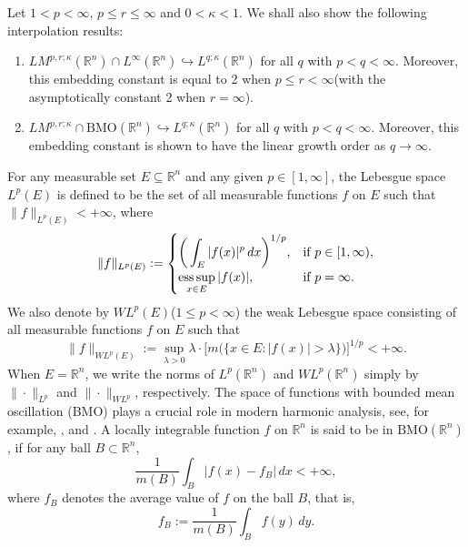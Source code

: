 \documentclass{birkjour}
\theoremstyle{definition}
\theoremstyle{remark}
\numberwithin{equation}{section}
\begin{document}
Let $1<p<\infty$, $p\leq r\leq\infty$ and $0<\kappa<1$. We shall also show the following interpolation results:
\begin{enumerate}
  \item $LM^{p,r;\kappa}(\mathbb R^n)\cap L^{\infty}(\mathbb R^n)\hookrightarrow L^{q;\kappa}(\mathbb R^n)$ for all $q$ with $p<q<\infty$. Moreover, this embedding constant is equal to 2 when $p\leq r<\infty$(with the asymptotically constant 2 when $r=\infty$).
  \item $LM^{p,r;\kappa}\cap \mathrm{BMO}(\mathbb R^n)\hookrightarrow L^{q;\kappa}(\mathbb R^n)$ for all $q$ with $p<q<\infty$. Moreover, this embedding constant is shown to have the linear growth order as $q\to\infty$.
\end{enumerate}
For any measurable set $E\subseteq\mathbb R^n$ and any given $p\in[1,\infty]$, the Lebesgue space $L^p(E)$ is defined to be the set of all measurable functions $f$ on $E$ such that $\|f\|_{L^p(E)}<+\infty$, where
\begin{equation*}
\|f\|_{L^p(E)}:=
\begin{cases}
\displaystyle\bigg(\int_{E}|f(x)|^p\,dx\bigg)^{1/p}, &\mbox{if}~ p\in[1,\infty),\\
\underset{x\in E}{\mbox{ess\,sup}}\,|f(x)|, &\mbox{if}~ p=\infty.
\end{cases}
\end{equation*}
We also denote by $WL^{p}(E)$($1\leq p<\infty$) the weak Lebesgue space consisting of all measurable functions $f$ on $E$ such that
\begin{equation*}
\|f\|_{WL^{p}(E)}:=
\sup_{\lambda>0}\lambda\cdot\Big[m\big(\big\{x\in E:|f(x)|>\lambda\big\}\big)\Big]^{1/p}<+\infty.
\end{equation*}
When $E=\mathbb R^n$, we write the norms of $L^p(\mathbb R^n)$ and $WL^{p}(\mathbb R^n)$ simply by $\|\cdot\|_{L^p}$ and $\|\cdot\|_{WL^{p}}$, respectively. The space of functions with bounded mean oscillation (BMO) plays a crucial role in modern harmonic analysis, see, for example,
\cite[Chapter 6]{duoand}, \cite[Chapter 3]{Grafakos} and \cite[Chapter 4]{stein2}. A locally integrable function $f$ on $\mathbb R^n$ is said to be in $\mathrm{BMO}(\mathbb R^n)$, if for any ball $B\subset\mathbb R^n$,
\begin{equation*}
\frac{1}{m(B)}\int_{B}|f(x)-f_{B}|\,dx<+\infty,
\end{equation*}
where $f_{B}$ denotes the average value of $f$ on the ball $B$, that is,
\begin{equation*}
f_{B}:=\frac{1}{m(B)}\int_{B}f(y)\,dy.
\end{equation*}
\end{document}
